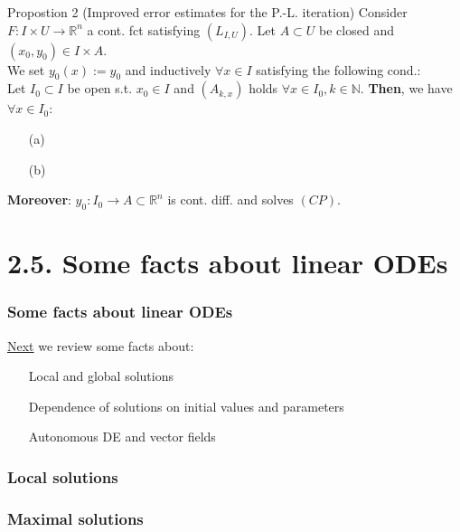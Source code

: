 \documentclass[10pt]{beamer}
\newcommand{\R}{\mathbb{R}}
\newcommand{\N}{\mathbb{N}}
\begin{document}
{\begin{frame}
\begin{block}{Propostion 2 (Improved error estimates for the P.-L. iteration)}
Consider $F: I \times U \rightarrow \R^n$ a cont. fct satisfying $(L_{I,U})$.
Let $A \subset U$ be closed and $(x_0,y_0) \in I \times A$.\\
We set $y_0(x):=y_0$ and inductively $\forall x \in I$ satisfying the following cond.:\\
\vspace{0.8cm}
Let $I_0 \subset I$ be open s.t. $x_0\in I$ and $(A_{k,x})$ holds $\forall x \in I_0, k \in \N$. \textbf{Then}, we have $\forall x \in I_0$:
\begin{itemize}
\item[(a)] \;\\
\vspace{0.4cm}
\item[(b)]\;\\
\vspace{0.4cm}
\end{itemize}
\textbf{Moreover}: $y_0:I_0 \rightarrow A \subset \R^n$ is cont. diff. and solves $(CP)$.
\end{block}
\end{frame}

\section{2.5. Some facts about linear ODEs}

\begin{frame}\frametitle{Some facts about linear ODEs}
\underline{Next} we review some facts about:
\vspace{0.2cm}
\begin{itemize}
\item[\ding{228}] Local and global solutions
\vspace{0.2cm}
\item[\ding{228}] Dependence of solutions on initial values and parameters
\vspace{0.2cm}
\item[\ding{228}] Autonomous DE and vector fields
\end{itemize}
\end{frame}

\begin{frame}\frametitle{Local solutions}

\end{frame}

\begin{frame}\frametitle{Maximal solutions}


\end{frame}}
\end{document}
